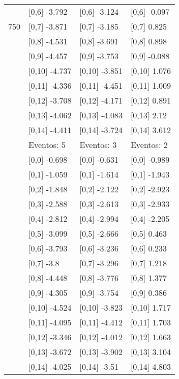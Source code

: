 \begin{table}
\begin{tabular}[t]{llll}
 & {}[0,6] -3.792 & {}[0,6] -3.124 & {}[0,6] -0.097\\
750 & {}[0,7] -3.871 & {}[0,7] -3.185 & {}[0,7] 0.825\\
\addlinespace
 & {}[0,8] -4.531 & {}[0,8] -3.691 & {}[0,8] 0.898\\
 & {}[0,9] -4.457 & {}[0,9] -3.753 & {}[0,9] -0.088\\
 & {}[0,10] -4.737 & {}[0,10] -3.851 & {}[0,10] 1.076\\
 & {}[0,11] -4.336 & {}[0,11] -4.451 & {}[0,11] 1.009\\
 & {}[0,12] -3.708 & {}[0,12] -4.171 & {}[0,12] 0.891\\
\addlinespace
 & {}[0,13] -4.062 & {}[0,13] -4.083 & {}[0,13] 2.12\\
 & {}[0,14] -4.411 & {}[0,14] -3.724 & {}[0,14] 3.612\\
 & Eventos:  5 & Eventos:  3 & Eventos:  2\\
 & {}[0,0] -0.698 & {}[0,0] -0.631 & {}[0,0] -0.989\\
 & {}[0,1] -1.059 & {}[0,1] -1.614 & {}[0,1] -1.943\\
\addlinespace
 & {}[0,2] -1.848 & {}[0,2] -2.122 & {}[0,2] -2.923\\
 & {}[0,3] -2.588 & {}[0,3] -2.613 & {}[0,3] -2.933\\
 & {}[0,4] -2.812 & {}[0,4] -2.994 & {}[0,4] -2.205\\
 & {}[0,5] -3.099 & {}[0,5] -2.666 & {}[0,5] 0.463\\
 & {}[0,6] -3.793 & {}[0,6] -3.236 & {}[0,6] 0.233\\
\addlinespace
1000 & {}[0,7] -3.8 & {}[0,7] -3.296 & {}[0,7] 1.218\\
 & {}[0,8] -4.448 & {}[0,8] -3.776 & {}[0,8] 1.377\\
 & {}[0,9] -4.305 & {}[0,9] -3.754 & {}[0,9] 0.386\\
 & {}[0,10] -4.524 & {}[0,10] -3.823 & {}[0,10] 1.717\\
 & {}[0,11] -4.095 & {}[0,11] -4.412 & {}[0,11] 1.703\\
\addlinespace
 & {}[0,12] -3.346 & {}[0,12] -4.012 & {}[0,12] 1.663\\
 & {}[0,13] -3.672 & {}[0,13] -3.902 & {}[0,13] 3.104\\
 & {}[0,14] -4.025 & {}[0,14] -3.51 & {}[0,14] 4.803\\
\bottomrule
\end{tabular}
\end{table}
